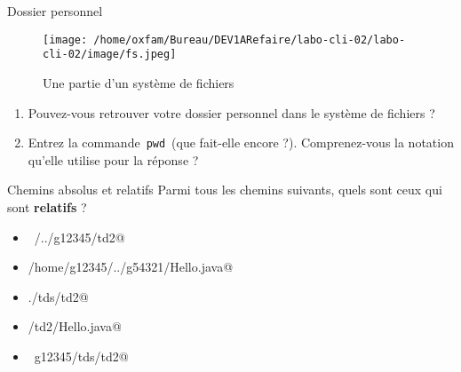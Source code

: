 \documentclass[a4paper,11pt]{article}
\begin{document}
\begin{Exercice}{Dossier personnel}
	

\begin{figure}[hbt]
	\begin{center}
		\texttt{[image: /home/oxfam/Bureau/DEV1ARefaire/labo-cli-02/labo-cli-02/image/fs.jpeg]}
	\end{center}
	
	\caption[Une partie d'un syst\`eme de fichiers]{Une partie d'un syst\`eme de fichiers}
\end{figure}

\begin{enumerate}
	
	\item 
	Pouvez-vous retrouver votre dossier personnel dans le syst\`eme de fichiers ?  
	
	\item 
	Entrez la commande \,\verb|pwd|\, (que fait-elle encore ?). 
	Comprenez-vous la notation qu'elle utilise pour la r\'eponse ?
	
\end{enumerate}

\end{Exercice}

\begin{Exercice}{Chemins absolus et relatifs}
	Parmi tous les chemins suivants, quels sont ceux qui sont 
	\textbf{relatifs} ?
	
	\begin{itemize} 
		
		\item[ \ding{"6F} ]  \verb@~/../g12345/td2@
		
		\item[ \ding{"6F} ]  \verb@/home/g12345/../g54321/Hello.java@
		
		\item[ \ding{"6F} ]  \verb@./tds/td2@
		
		\item[ \ding{"6F} ]  \verb@tds/td2/Hello.java@
		
		\item[ \ding{"6F} ]  \verb@~g12345/tds/td2@
		
	\end{itemize} 
\end{Exercice}
\end{document}
